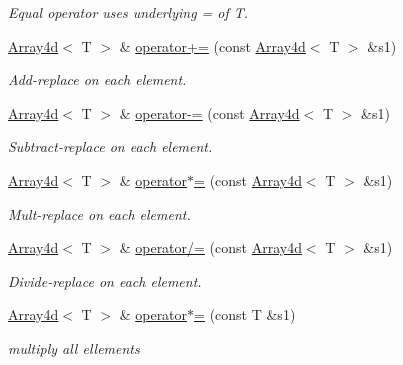 \begin{DoxyCompactItemize}
\begin{DoxyCompactList}\small\item\em Equal operator uses underlying = of T. \end{DoxyCompactList}\item 
\mbox{\hyperlink{classXMLArray_1_1Array4d}{Array4d}}$<$ T $>$ \& \mbox{\hyperlink{classXMLArray_1_1Array4d_a3ee4e8302e86bcfec817cae81a5fe1bf}{operator+=}} (const \mbox{\hyperlink{classXMLArray_1_1Array4d}{Array4d}}$<$ T $>$ \&s1)
\begin{DoxyCompactList}\small\item\em Add-\/replace on each element. \end{DoxyCompactList}\item 
\mbox{\hyperlink{classXMLArray_1_1Array4d}{Array4d}}$<$ T $>$ \& \mbox{\hyperlink{classXMLArray_1_1Array4d_ad192d15277494d22a81c86852eaa5466}{operator-\/=}} (const \mbox{\hyperlink{classXMLArray_1_1Array4d}{Array4d}}$<$ T $>$ \&s1)
\begin{DoxyCompactList}\small\item\em Subtract-\/replace on each element. \end{DoxyCompactList}\item 
\mbox{\hyperlink{classXMLArray_1_1Array4d}{Array4d}}$<$ T $>$ \& \mbox{\hyperlink{classXMLArray_1_1Array4d_accb002ecd8742a2aba3e4acaf92963c6}{operator$\ast$=}} (const \mbox{\hyperlink{classXMLArray_1_1Array4d}{Array4d}}$<$ T $>$ \&s1)
\begin{DoxyCompactList}\small\item\em Mult-\/replace on each element. \end{DoxyCompactList}\item 
\mbox{\hyperlink{classXMLArray_1_1Array4d}{Array4d}}$<$ T $>$ \& \mbox{\hyperlink{classXMLArray_1_1Array4d_ac8d0ba2bc4f085bf48baf6530db0cfcb}{operator/=}} (const \mbox{\hyperlink{classXMLArray_1_1Array4d}{Array4d}}$<$ T $>$ \&s1)
\begin{DoxyCompactList}\small\item\em Divide-\/replace on each element. \end{DoxyCompactList}\item 
\mbox{\hyperlink{classXMLArray_1_1Array4d}{Array4d}}$<$ T $>$ \& \mbox{\hyperlink{classXMLArray_1_1Array4d_ac8c9fbcc39636658f94e7adc00c172b3}{operator$\ast$=}} (const T \&s1)
\begin{DoxyCompactList}\small\item\em multiply all ellements \end{DoxyCompactList}\item 

\end{DoxyCompactItemize}
